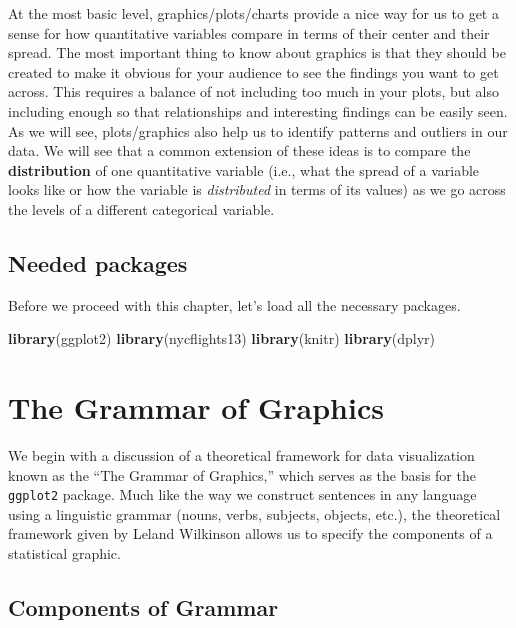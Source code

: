 \documentclass[]{tufte-book}
\newenvironment{Shaded}{\begin{snugshade}}{\end{snugshade}}
\newcommand{\KeywordTok}[1]{\textcolor[rgb]{0.13,0.29,0.53}{\textbf{{#1}}}}
\newcommand{\NormalTok}[1]{{#1}}
\begin{document}
At the most basic level, graphics/plots/charts provide a nice way for us
to get a sense for how quantitative variables compare in terms of their
center and their spread. The most important thing to know about graphics
is that they should be created to make it obvious for your audience to
see the findings you want to get across. This requires a balance of not
including too much in your plots, but also including enough so that
relationships and interesting findings can be easily seen. As we will
see, plots/graphics also help us to identify patterns and outliers in
our data. We will see that a common extension of these ideas is to
compare the \textbf{distribution} of one quantitative variable (i.e.,
what the spread of a variable looks like or how the variable is
\emph{distributed} in terms of its values) as we go across the levels of
a different categorical variable.

\subsection*{Needed packages}\label{needed-packages-1}

Before we proceed with this chapter, let's load all the necessary
packages.

\begin{Shaded}
\begin{Highlighting}[]
\KeywordTok{library}\NormalTok{(ggplot2)}
\KeywordTok{library}\NormalTok{(nycflights13)}
\KeywordTok{library}\NormalTok{(knitr)}
\KeywordTok{library}\NormalTok{(dplyr)}
\end{Highlighting}
\end{Shaded}

\section{The Grammar of Graphics}\label{grammarofgraphics}

We begin with a discussion of a theoretical framework for data
visualization known as the ``The Grammar of Graphics,'' which serves as
the basis for the \texttt{ggplot2} package. Much like the way we
construct sentences in any language using a linguistic grammar (nouns,
verbs, subjects, objects, etc.), the theoretical framework given by
Leland Wilkinson \citep{wilkinson2005} allows us to specify the
components of a statistical graphic.

\subsection{Components of Grammar}\label{components-of-grammar}
\end{document}
